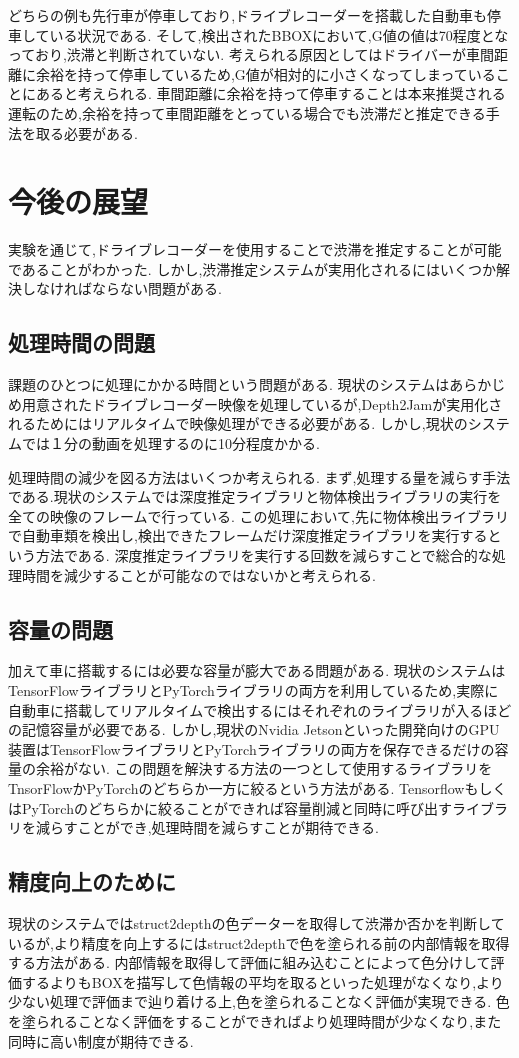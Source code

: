 どちらの例も先行車が停車しており,ドライブレコーダーを搭載した自動車も停車している状況である.
そして,検出されたBBOXにおいて,G値の値は70程度となっており,渋滞と判断されていない.
考えられる原因としてはドライバーが車間距離に余裕を持って停車しているため,G値が相対的に小さくなってしまっていることにあると考えられる.
車間距離に余裕を持って停車することは本来推奨される運転のため,余裕を持って車間距離をとっている場合でも渋滞だと推定できる手法を取る必要がある.

\newpage
\section{今後の展望}
実験を通じて,ドライブレコーダーを使用することで渋滞を推定することが可能であることがわかった.
しかし,渋滞推定システムが実用化されるにはいくつか解決しなければならない問題がある.
\subsection{処理時間の問題}
課題のひとつに処理にかかる時間という問題がある.
現状のシステムはあらかじめ用意されたドライブレコーダー映像を処理しているが,Depth2Jamが実用化されるためにはリアルタイムで映像処理ができる必要がある.
しかし,現状のシステムでは１分の動画を処理するのに10分程度かかる.

処理時間の減少を図る方法はいくつか考えられる.
まず,処理する量を減らす手法である.現状のシステムでは深度推定ライブラリと物体検出ライブラリの実行を全ての映像のフレームで行っている.
この処理において,先に物体検出ライブラリで自動車類を検出し,検出できたフレームだけ深度推定ライブラリを実行するという方法である.
深度推定ライブラリを実行する回数を減らすことで総合的な処理時間を減少することが可能なのではないかと考えられる.

\subsection{容量の問題}
加えて車に搭載するには必要な容量が膨大である問題がある.
現状のシステムはTensorFlowライブラリとPyTorchライブラリの両方を利用しているため,実際に自動車に搭載してリアルタイムで検出するにはそれぞれのライブラリが入るほどの記憶容量が必要である.
しかし,現状のNvidia Jetsonといった開発向けのGPU装置はTensorFlowライブラリとPyTorchライブラリの両方を保存できるだけの容量の余裕がない.
この問題を解決する方法の一つとして使用するライブラリをTnsorFlowかPyTorchのどちらか一方に絞るという方法がある.
TensorflowもしくはPyTorchのどちらかに絞ることができれば容量削減と同時に呼び出すライブラリを減らすことができ,処理時間を減らすことが期待できる.

\subsection{精度向上のために}
現状のシステムではstruct2depthの色データーを取得して渋滞か否かを判断しているが,より精度を向上するにはstruct2depthで色を塗られる前の内部情報を取得する方法がある.
内部情報を取得して評価に組み込むことによって色分けして評価するよりもBOXを描写して色情報の平均を取るといった処理がなくなり,より少ない処理で評価まで辿り着ける上,色を塗られることなく評価が実現できる.
色を塗られることなく評価をすることができればより処理時間が少なくなり,また同時に高い制度が期待できる.